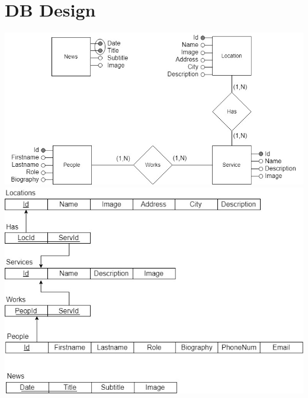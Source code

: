 %
%
\chapter{DB Design}
%
%
\includegraphics[scale=0.5]{MainMatter/ER.jpg}
\includegraphics[scale=0.4]{MainMatter/DB.jpg}
%
%
